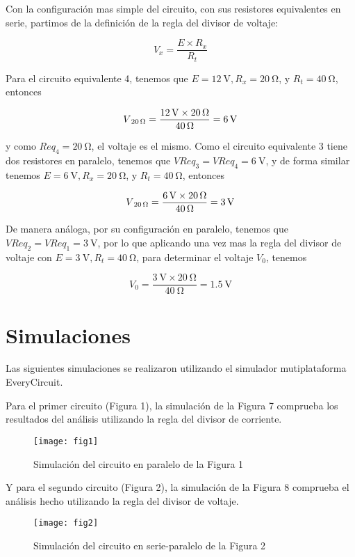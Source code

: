 \documentclass[a4paper,12pt]{article}
\begin{document}
\vspace{.5cm}

Con la configuración mas simple del circuito, con sus resistores equivalentes en serie, partimos de la definición de la regla del divisor de voltaje:

\[
	V_x = \frac{E \times R_x}{R_t}
\]

Para el circuito equivalente 4, tenemos que $E = \SI{12}{\volt}, R_x = \SI{20}{\ohm}$, y  $R_t = \SI{40}{\ohm}$, entonces

\[
	V\textsubscript{{\SI{20}{\ohm}}} = \frac{\SI{12}{\volt} \times \SI{20}{\ohm}}{\SI{40}{\ohm}} = \SI{6}{\volt}
\]

y como $Req_4 = \SI{20}{\ohm}$, el voltaje es el mismo. Como el circuito equivalente 3 tiene dos resistores en paralelo, tenemos que $VReq_3 = VReq_4 = \SI{6}{\volt}$, y de forma similar tenemos $E = \SI{6}{\volt}, R_x = \SI{20}{\ohm}$, y  $R_t = \SI{40}{\ohm}$, entonces

\[
	V\textsubscript{{\SI{20}{\ohm}}} = \frac{\SI{6}{\volt} \times \SI{20}{\ohm}}{\SI{40}{\ohm}} = \SI{3}{\volt}
\]

De manera análoga, por su configuración en paralelo, tenemos que $VReq_2 = VReq_1 = \SI{3}{\volt}$, por lo que aplicando una vez mas la regla del divisor de voltaje con $E = \SI{3}{\volt}, R_t = \SI{40}{\ohm}$, para determinar el voltaje $V_0$, tenemos

\[
	V_0 = \frac{\SI{3}{\volt} \times \SI{20}{\ohm}}{\SI{40}{\ohm}} = \SI{1.5}{\volt}
\]

\newpage


\section*{Simulaciones}

Las siguientes simulaciones se realizaron utilizando el simulador mutiplataforma EveryCircuit\texttrademark.\par

\vspace{.5cm}

Para el primer circuito (Figura 1), la simulación de la Figura 7 comprueba los resultados del análisis utilizando la regla del divisor de corriente.

\vspace{.5cm}

\begin{figure}[!h]
\centering
	\texttt{[image: fig1]}
	\label{fig5}
	 \caption{Simulación del circuito en paralelo de la Figura 1}
\end{figure}

\vspace{.5cm}

Y para el segundo circuito (Figura 2), la simulación de la Figura 8 comprueba el análisis hecho utilizando la regla del divisor de voltaje.

\vspace{.5cm}

\begin{figure}[!h]
\centering
	\texttt{[image: fig2]}
	\label{fig5}
	 \caption{Simulación del circuito en serie-paralelo de la Figura 2}
\end{figure}
\end{document}
